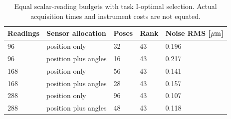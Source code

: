 \begin{table}[H]\centering\small
\begin{tabular}{lllll}\toprule
Readings & Sensor allocation & Poses & Rank & Noise RMS [$\mu\mathrm{m}$]\\\midrule
96 & position only & 32 & 43 & 0.196\\
96 & position plus angles & 16 & 43 & 0.217\\
168 & position only & 56 & 43 & 0.141\\
168 & position plus angles & 28 & 43 & 0.157\\
288 & position only & 96 & 43 & 0.107\\
288 & position plus angles & 48 & 43 & 0.118\\
\bottomrule\end{tabular}\caption{Equal scalar-reading budgets with task I-optimal selection. Actual acquisition times and instrument costs are not equated.}\label{tab:publication_sensor_table}\end{table}
